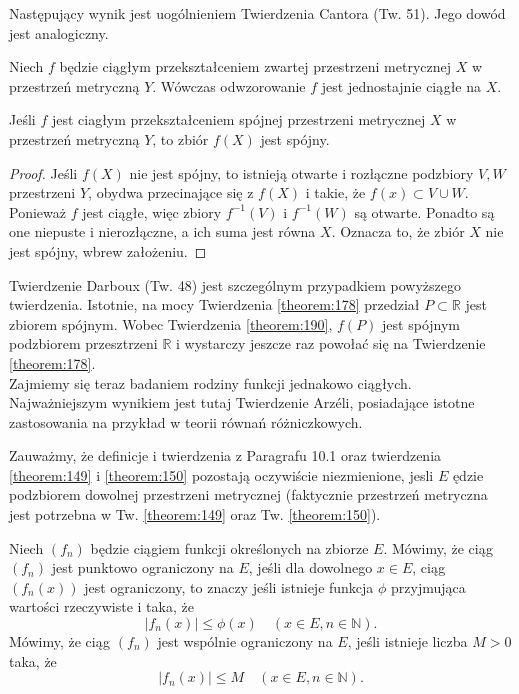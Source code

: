 \documentclass[leqno]{article}
\begin{document}
\begin{justify}
Następujący wynik jest uogólnieniem Twierdzenia Cantora  (Tw. 51). Jego dowód jest analogiczny.

\begin{theorem}
{
    Niech $f$ będzie ciągłym przekształceniem zwartej przestrzeni metrycznej $X$ w przestrzeń metryczną $Y$.
    Wówczas odwzorowanie $f$ jest jednostajnie ciągłe na $X$.
}
\end{theorem}

\begin{theorem}
{
    Jeśli $f$ jest ciagłym przekształceniem spójnej przestrzeni metrycznej $X$ w przestrzeń metryczną $Y$, to zbiór $f(X)$ jest spójny.
}
\end{theorem}

\begin{proof}
    Jeśli $f(X)$ nie jest spójny, to istnieją otwarte i rozłączne podzbiory $V, W$ przestrzeni $Y$, obydwa przecinające się z $f(X)$ i takie, że $f(x) \subset V \cup W$.
    Ponieważ $f$ jest ciągłe, więc zbiory $f^{-1}(V)$ i $f^{-1}(W)$ są otwarte.
    Ponadto są one niepuste i nierozłączne, a ich suma jest równa $X$. Oznacza to, że zbiór $X$ nie jest spójny, wbrew założeniu.
\end{proof}

Twierdzenie Darboux (Tw. 48) jest szczególnym przypadkiem powyższego twierdzenia. Istotnie, na mocy Twierdzenia \ref{theorem:178} przedział
$P \subset \mathbb{R}$ jest zbiorem spójnym. Wobec Twierdzenia \ref{theorem:190}, $f(P)$ jest spójnym podzbiorem przesztrzeni $\mathbb{R}$ i wystarczy jeszcze raz powołać się na Twierdzenie \ref{theorem:178}. \\
Zajmiemy się teraz badaniem rodziny funkcji jednakowo ciągłych. Najważniejszym wynikiem jest tutaj Twierdzenie Arzéli,
posiadające istotne zastosowania na przykład w teorii równań różniczkowych.

\begin{uwaga}
    Zauważmy, że definicje i twierdzenia z Paragrafu 10.1 oraz twierdzenia \ref{theorem:149} i \ref{theorem:150}
    pozostają oczywiście niezmienione, jesli $E$ ędzie podzbiorem dowolnej przestrzeni metrycznej (faktycznie przestrzeń metryczna jest potrzebna w Tw. \ref{theorem:149} oraz Tw. \ref{theorem:150}).
\end{uwaga}

\begin{defn}
    Niech $(f_n)$ będzie ciągiem funkcji określonych na zbiorze $E$. Mówimy, że ciąg $(f_n)$ jest punktowo ograniczony na $E$, jeśli dla dowolnego $x \in E$, ciąg $(f_n(x))$ jest 
    ograniczony, to znaczy jeśli istnieje funkcja $\phi$ przyjmująca wartości rzeczywiste i taka, że 
    \[
        |f_n(x)| \leqslant \phi(x) \quad (x \in E, n \in \mathbb{N}).
    \]
    Mówimy, że ciąg $(f_n)$ jest wspólnie ograniczony na $E$, jeśli istnieje liczba $M > 0$ taka, że
    \[
        |f_n(x)| \leqslant M \quad (x \in E, n \in \mathbb{N}).
    \]
\end{defn}


\end{justify}
\end{document}
